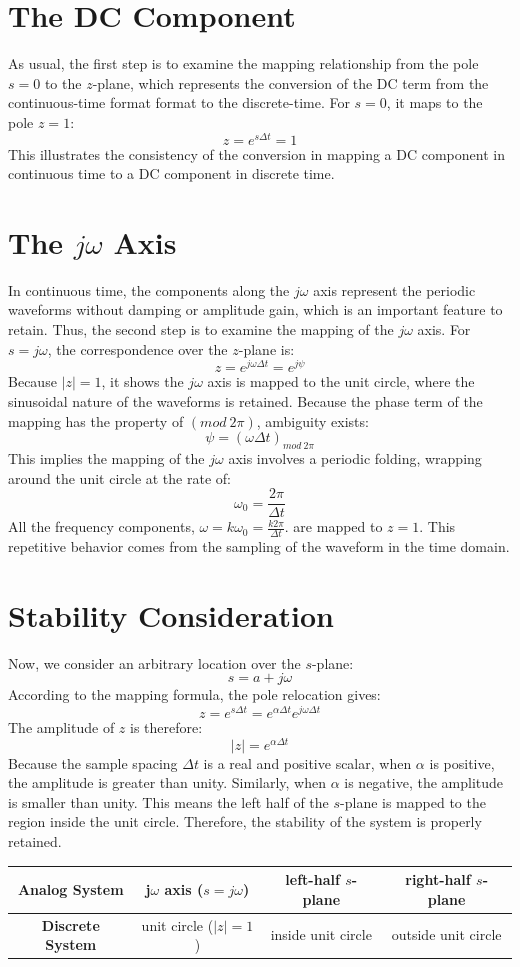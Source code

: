 \documentclass{article}
\begin{document}
\section{The DC Component}
As usual, the first step is to examine the mapping relationship from the pole \(s=0\) to the \(z\)-plane, which represents the conversion of the DC term from the continuous-time format format to the discrete-time. For \(s=0\), it maps to the pole \(z=1\):
\[
z=e^{s\Delta t}=1
\]
This illustrates the consistency of the conversion in mapping a DC component in continuous time to a DC component in discrete time.

\section{The \(j\omega\) Axis}
In continuous time, the components along the \(j\omega\) axis represent the periodic waveforms without damping or amplitude gain, which is an important feature to retain. Thus, the second step is to examine the mapping of the \(j\omega\) axis. For \(s=j\omega\), the correspondence over the \(z\)-plane is:
\[
z=e^{j\omega\Delta t}=e^{j\psi}
\]
Because \(|z|=1\), it shows the \(j\omega\) axis is mapped to the unit circle, where the sinusoidal nature of the waveforms is retained. Because the phase term of the mapping has the property of \((mod \ 2\pi)\), ambiguity exists:
\[
\psi = (\omega\Delta t)_{mod \ 2\pi}
\]
This implies the mapping of the \(j\omega\) axis involves a periodic folding, wrapping around the unit circle at the rate of:
\[
\omega_0=\frac{2\pi}{\Delta t}
\]
All the frequency components, \(\omega=k\omega_0=\frac{k2\pi}{\Delta t}\). are mapped to \(z=1\). This repetitive behavior comes from the sampling of the waveform in the time domain.
\section{Stability Consideration}
Now, we consider an arbitrary location over the \(s\)-plane:
\[
s=a+j\omega
\]
According to the mapping formula, the pole relocation gives:
\[
z=e^{s\Delta t}=e^{\alpha\Delta t}e^{j\omega\Delta t}
\]
The amplitude of \(z\) is therefore:
\[
|z|=e^{\alpha\Delta t}
\]
Because the sample spacing \(\Delta t\) is a real and positive scalar, when \(\alpha\) is positive, the amplitude is greater than unity. Similarly, when \(\alpha\) is negative, the amplitude is smaller than unity. This means the left half of the \(s\)-plane is mapped to the region inside the unit circle. Therefore, the stability of the system is properly retained.
\begin{table}[h]
\centering
\begin{tabular}{|c|c|c|c|}
\hline
\textbf{Analog System} & j$\omega$ axis ($s = j\omega$) & left-half $s$-plane & right-half $s$-plane \\ \hline
\textbf{Discrete System} & unit circle ($|z| = 1$) & inside unit circle & outside unit circle \\ \hline
\end{tabular}
\end{table}
\end{document}
